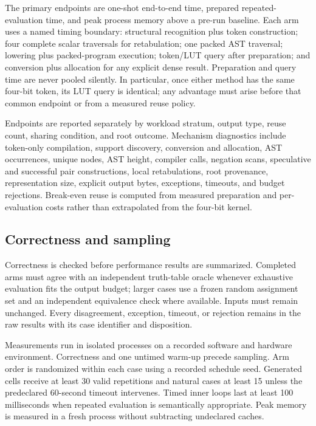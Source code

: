 \documentclass[11pt]{article}
\begin{document}
The primary endpoints are one-shot end-to-end time, prepared repeated-
evaluation time, and peak process memory above a pre-run baseline. Each arm
uses a named timing boundary: structural recognition plus token construction;
four complete scalar traversals for retabulation; one packed AST traversal;
lowering plus packed-program execution; token/LUT query after preparation; and
conversion plus allocation for any explicit dense result. Preparation and
query time are never pooled silently. In particular, once either method has
the same four-bit token, its LUT query is identical; any advantage must arise
before that common endpoint or from a measured reuse policy.

Endpoints are reported separately by workload stratum, output type, reuse
count, sharing condition, and root outcome. Mechanism diagnostics include
token-only compilation, support discovery, conversion and allocation, AST
occurrences, unique nodes, AST height, compiler calls, negation scans,
speculative and successful pair constructions, local retabulations, root
provenance, representation size, explicit output bytes, exceptions, timeouts,
and budget rejections. Break-even reuse is computed from measured preparation
and per-evaluation costs rather than extrapolated from the four-bit kernel.

\subsection{Correctness and sampling}

Correctness is checked before performance results are summarized. Completed
arms must agree with an independent truth-table oracle whenever exhaustive
evaluation fits the output budget; larger cases use a frozen random assignment
set and an independent equivalence check where available. Inputs must remain
unchanged. Every disagreement, exception, timeout, or rejection remains in the
raw results with its case identifier and disposition.

Measurements run in isolated processes on a recorded software and hardware
environment. Correctness and one untimed warm-up precede sampling. Arm order is
randomized within each case using a recorded schedule seed. Generated cells
receive at least 30 valid repetitions and natural cases at least 15 unless the
predeclared 60-second timeout intervenes. Timed inner loops last at least
100 milliseconds when repeated evaluation is semantically appropriate. Peak
memory is measured in a fresh process without subtracting undeclared caches.
\end{document}
